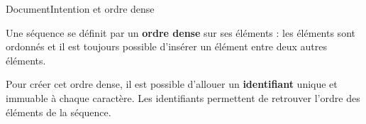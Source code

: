 \begin{frame}{Document}{Intention et ordre dense}
  



  


  \vspace{0.5cm}

  Une séquence se définit par un \textbf{ordre dense} sur ses éléments : les
  éléments sont ordonnés et il est toujours possible d'insérer un élément entre
  deux autres éléments.

  \vspace{0.75cm}

  Pour créer cet ordre dense, il est possible d'allouer un \textbf{identifiant}
  unique et immuable à chaque caractère. Les
  identifiants permettent de retrouver l'ordre des éléments de la séquence.
  
  

  
\end{frame}

